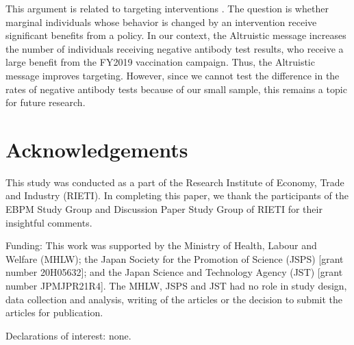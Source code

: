 \documentclass[
      12pt,
    a4paper
]{article}
\begin{document}
This argument is related to targeting interventions \citep[e.g.,][]{Finkelstein2019}. The question is whether marginal individuals whose behavior is changed by an intervention receive significant benefits from a policy. In our context, the Altruistic message increases the number of individuals receiving negative antibody test results, who receive a large benefit from the FY2019 vaccination campaign. Thus, the Altruistic message improves targeting. However, since we cannot test the difference in the rates of negative antibody tests because of our small sample, this remains a topic for future research.

\hypertarget{acknowledgements}{%
\section*{Acknowledgements}\label{acknowledgements}}

This study was conducted as a part of the Research Institute of Economy, Trade and Industry (RIETI). In completing this paper, we thank the participants of the EBPM Study Group and Discussion Paper Study Group of RIETI for their insightful comments.

\noindent
Funding: This work was supported by the Ministry of Health, Labour and Welfare (MHLW); the Japan Society for the Promotion of Science (JSPS) {[}grant number 20H05632{]}; and the Japan Science and Technology Agency (JST) {[}grant number JPMJPR21R4{]}. The MHLW, JSPS and JST had no role in study design, data collection and analysis, writing of the articles or the decision to submit the articles for publication.

\noindent
Declarations of interest: none.

\clearpage


\end{document}
